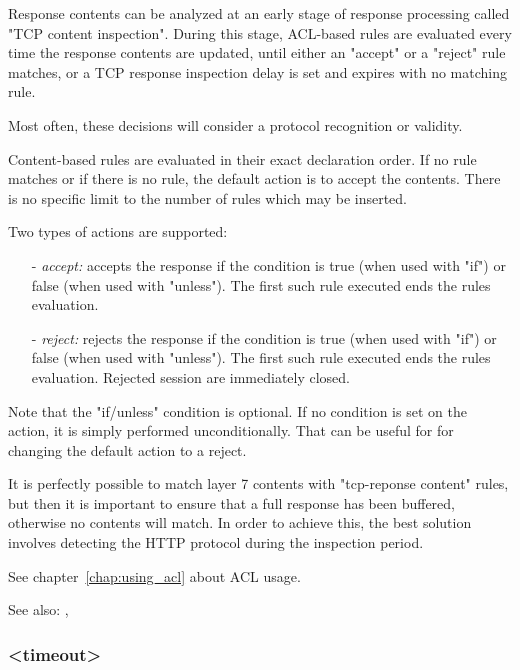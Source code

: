   Response contents can be analyzed at an early stage of response processing
  called "TCP content inspection". During this stage, ACL-based rules are
  evaluated every time the response contents are updated, until either an
  "accept" or a "reject" rule matches, or a TCP response inspection delay is
  set and expires with no matching rule.

  Most often, these decisions will consider a protocol recognition or validity.

  Content-based rules are evaluated in their exact declaration order. If no
  rule matches or if there is no rule, the default action is to accept the
  contents. There is no specific limit to the number of rules which may be
  inserted.

  Two types of actions are supported:
  \begin{itemize}
  \item[-] \emph{accept:}
        accepts the response if the condition is true (when used with "if")
        or false (when used with "unless"). The first such rule executed ends
        the rules evaluation.

  \item[-] \emph{reject:}
        rejects the response if the condition is true (when used with "if")
        or false (when used with "unless"). The first such rule executed ends
        the rules evaluation. Rejected session are immediately closed.
  \end{itemize}

  Note that the "if/unless" condition is optional. If no condition is set on
  the action, it is simply performed unconditionally. That can be useful for
  for changing the default action to a reject.

  It is perfectly possible to match layer 7 contents with "tcp-reponse content"
  rules, but then it is important to ensure that a full response has been
  buffered, otherwise no contents will match. In order to achieve this, the
  best solution involves detecting the HTTP protocol during the inspection
  period.

  See chapter~\ref{chap:using_acl} about ACL usage.


See also: , 

\subsubsection[tcp-response]{ <timeout>}


